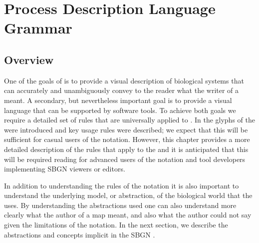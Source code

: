 \chapter{Process Description Language Grammar}
\label{chp:grammar}

\section{Overview}

One of the goals of \SBGNPDLone is to provide a visual description of biological systems that can accurately and unambiguously  convey to the reader what the writer of a \PDm meant. A secondary, but nevertheless important goal is to provide a visual language that can be supported by software tools. To achieve both goals we require a detailed set of rules that are universally applied to \PDms. In  the glyphs of the \PDl were introduced and key usage rules were described; we expect that this will be sufficient for casual users of the notation. However, this chapter provides a more detailed description of the rules that apply to the \PDl and it is anticipated that this will be required reading for advanced users of the notation and tool developers implementing SBGN \PD viewers or editors.

In addition to understanding the rules of the notation it is also important to understand the underlying model, or abstraction, of the biological world that the \PDl uses. By understanding the abstractions used one can also understand more clearly what the author of a map meant, and also what the author could not say given the limitations of the notation. In the next section, we describe the abstractions and concepts implicit in the SBGN \PDl.



